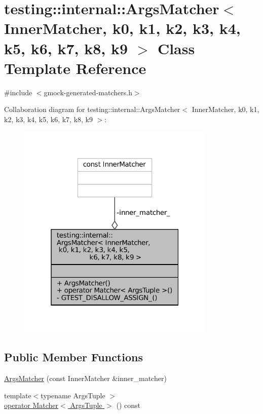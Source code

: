 \hypertarget{classtesting_1_1internal_1_1ArgsMatcher}{}\section{testing\+:\+:internal\+:\+:Args\+Matcher$<$ Inner\+Matcher, k0, k1, k2, k3, k4, k5, k6, k7, k8, k9 $>$ Class Template Reference}
\label{classtesting_1_1internal_1_1ArgsMatcher}


{\ttfamily \#include $<$gmock-\/generated-\/matchers.\+h$>$}



Collaboration diagram for testing\+:\+:internal\+:\+:Args\+Matcher$<$ Inner\+Matcher, k0, k1, k2, k3, k4, k5, k6, k7, k8, k9 $>$\+:
\nopagebreak
\begin{figure}[H]
\begin{center}
\leavevmode
\includegraphics[width=268pt]{classtesting_1_1internal_1_1ArgsMatcher__coll__graph}
\end{center}
\end{figure}
\subsection*{Public Member Functions}
\begin{DoxyCompactItemize}
\item 
\hyperlink{classtesting_1_1internal_1_1ArgsMatcher_a2879d7455f2da2a5a2f2b6759dbc0561}{Args\+Matcher} (const Inner\+Matcher \&inner\+\_\+matcher)
\item 
{\footnotesize template$<$typename Args\+Tuple $>$ }\\\hyperlink{classtesting_1_1internal_1_1ArgsMatcher_ad55698b0de384a9d8875cef5b172cb4a}{operator Matcher$<$ Args\+Tuple $>$} () const
\end{DoxyCompactItemize}
